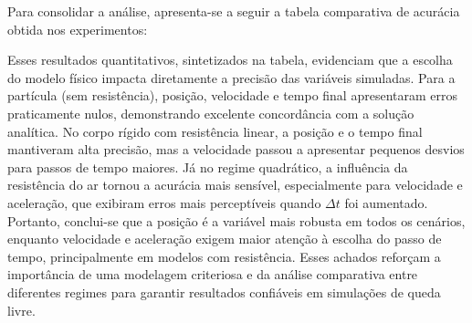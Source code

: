 Para consolidar a análise, apresenta-se a seguir a tabela comparativa de acurácia obtida nos experimentos:

\begin{center}
	
	\label{tab:tabela_acuracia}
\end{center}


\noindent



Esses resultados quantitativos, sintetizados na tabela, evidenciam que a escolha do modelo físico impacta diretamente a precisão das variáveis simuladas. Para a partícula (sem resistência), posição, velocidade e tempo final apresentaram erros praticamente nulos, demonstrando excelente concordância com a solução analítica. No corpo rígido com resistência linear, a posição e o tempo final mantiveram alta precisão, mas a velocidade passou a apresentar pequenos desvios para passos de tempo maiores. Já no regime quadrático, a influência da resistência do ar tornou a acurácia mais sensível, especialmente para velocidade e aceleração, que exibiram erros mais perceptíveis quando $\Delta t$ foi aumentado. Portanto, conclui-se que a posição é a variável mais robusta em todos os cenários, enquanto velocidade e aceleração exigem maior atenção à escolha do passo de tempo, principalmente em modelos com resistência. Esses achados reforçam a importância de uma modelagem criteriosa e da análise comparativa entre diferentes regimes para garantir resultados confiáveis em simulações de queda livre.

